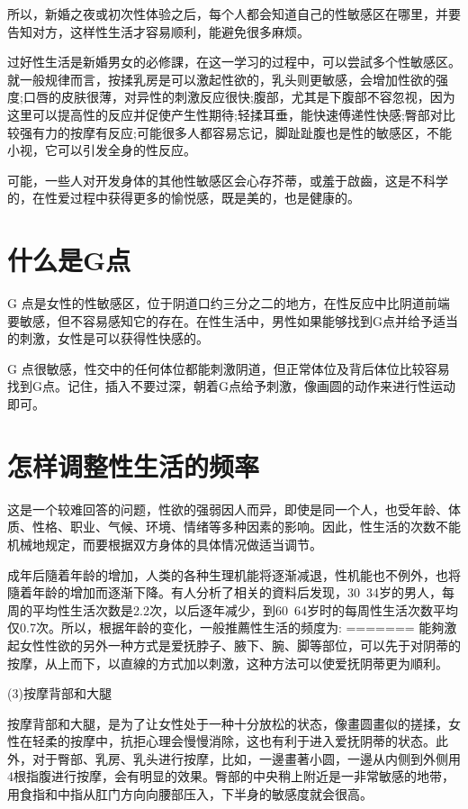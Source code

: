 \documentclass[12pt,UTF8]{ctexbook}
\begin{document}
所以，新婚之夜或初次性体验之后，每个人都会知道自己的性敏感区在哪里，并要告知对方，这样性生活才容易顺利，能避免很多麻烦。

过好性生活是新婚男女的必修課，在这一学习的过程中，可以尝試多个性敏感区。就一般规律而言，按揉乳房是可以激起性欲的，乳头则更敏感，会增加性欲的强度;口唇的皮肤很薄，对异性的刺激反应很快;腹部，尤其是下腹部不容忽视，因为这里可以提高性的反应并促使产生性期待;轻揉耳垂，能快速傅递性快感;臀部对比较强有力的按摩有反应;可能很多人都容易忘记，脚趾趾腹也是性的敏感区，不能小视，它可以引发全身的性反应。

可能，一些人对开发身体的其他性敏感区会心存芥蒂，或羞于啟齒，这是不科学的，在性爱过程中获得更多的愉悦感，既是美的，也是健康的。

\section{什么是G点}

G 点是女性的性敏感区，位于阴道口约三分之二的地方，在性反应中比阴道前端要敏感，但不容易感知它的存在。在性生活中，男性如果能够找到G点并给予适当的刺激，女性是可以获得性快感的。

G 点很敏感，性交中的任何体位都能刺激阴道，但正常体位及背后体位比较容易找到G点。记住，插入不要过深，朝着G点给予刺激，像画圆的动作来进行性运动即可。

\section{怎样调整性生活的频率}

这是一个较难回答的问题，性欲的强弱因人而异，即使是同一个人，也受年龄、体质、性格、职业、气候、环境、情绪等多种因素的影响。因此，性生活的次数不能机械地规定，而要根据双方身体的具体情况做适当调节。

成年后隨着年龄的增加，人类的各种生理机能将逐渐减退，性机能也不例外，也将隨着年龄的增加而逐渐下降。有人分析了相关的資料后发现，30~34岁的男人，每周的平均性生活次数是2.2次，以后逐年减少，到60~64岁时的每周性生活次数平均仅0.7次。所以，根据年龄的变化，一般推薦性生活的频度为:
=======
能夠激起女性性欲的另外一种方式是爱抚脖子、腋下、腕、脚等部位，可以先于对阴蒂的按摩，从上而下，以直線的方式加以刺激，这种方法可以使爱抚阴蒂更为順利。

(3)按摩背部和大腿

按摩背部和大腿，是为了让女性处于一种十分放松的状态，像畫圆畫似的搓揉，女性在轻柔的按摩中，抗拒心理会慢慢消除，这也有利于进入爱抚阴蒂的状态。此外，对于臀部、乳房、乳头进行按摩，比如，一邊畫著小圆，一邊从内侧到外侧用4根指腹进行按摩，会有明显的效果。臀部的中央稍上附近是一非常敏感的地带，用食指和中指从肛门方向向腰部压入，下半身的敏感度就会很高。
\end{document}
